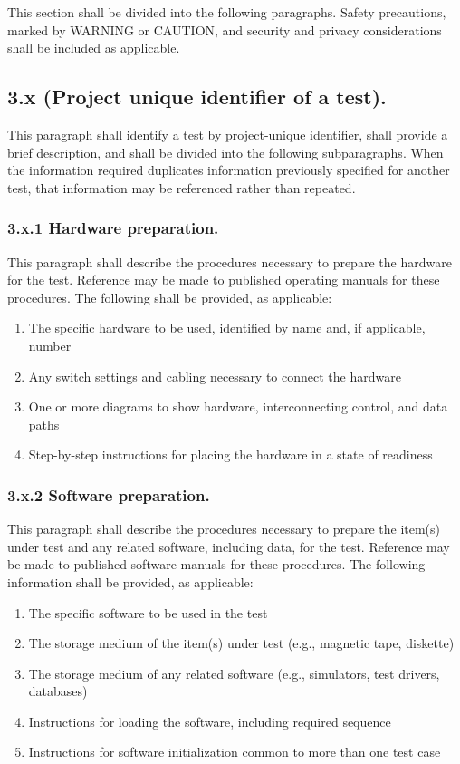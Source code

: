 This section shall be divided into the following paragraphs. Safety
precautions, marked by WARNING or CAUTION, and security and privacy
considerations shall be included as applicable.

\subsection{3.x (Project unique identifier of a test).}

This paragraph shall identify a test by project-unique identifier, shall
provide a brief description, and shall be divided into the following
subparagraphs. When the information required duplicates information
previously specified for another test, that information may be
referenced rather than repeated.

\subsubsection{3.x.1 Hardware preparation.}

This paragraph shall describe the procedures necessary to prepare the
hardware for the test. Reference may be made to published operating
manuals for these procedures. The following shall be provided, as
applicable:

\begin{enumerate}
\itemsep1pt\parskip0pt
\item
  The specific hardware to be used, identified by name and, if
  applicable, number
\item
  Any switch settings and cabling necessary to connect the hardware
\item
  One or more diagrams to show hardware, interconnecting control, and
  data paths
\item
  Step-by-step instructions for placing the hardware in a state of
  readiness
\end{enumerate}

\subsubsection{3.x.2 Software preparation.}

This paragraph shall describe the procedures necessary to prepare the
item(s) under test and any related software, including data, for the
test. Reference may be made to published software manuals for these
procedures. The following information shall be provided, as applicable:

\begin{enumerate}
\itemsep1pt\parskip0pt
\item
  The specific software to be used in the test
\item
  The storage medium of the item(s) under test (e.g., magnetic tape,
  diskette)
\item
  The storage medium of any related software (e.g., simulators, test
  drivers, databases)
\item
  Instructions for loading the software, including required sequence
\item
  Instructions for software initialization common to more than one test
  case
\end{enumerate}

